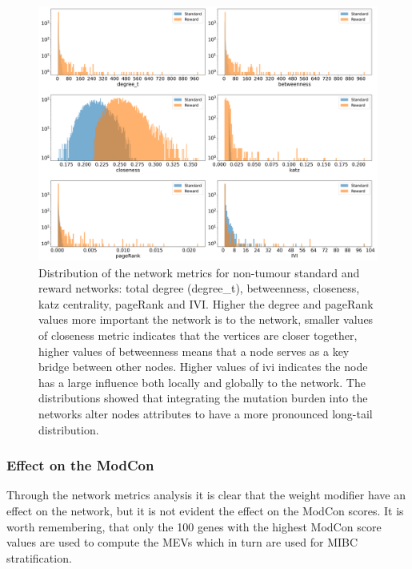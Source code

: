 \begin{figure}[!t]    
    \centering
    \includegraphics[width=1.0\textwidth,height=1.0\textheight,keepaspectratio]{Sections/Network_II/validation/net_metrics_Standard_Reward.png}
    \caption{Distribution of the network metrics for non-tumour standard and reward networks: total degree (degree\_t), betweenness, closeness, katz centrality, pageRank and IVI.  Higher the degree and pageRank values more important the network is to the network, smaller values of closeness metric indicates that the vertices are closer together, higher values of betweenness means that a node serves as a key bridge between other nodes. Higher values of \acrlong{ivi} indicates the node has a large influence both locally and globally to the network. The distributions showed that integrating the mutation burden into the networks alter nodes attributes to have a more pronounced long-tail distribution. }
    \label{fig:N_II:net_metric_sig_std}
\end{figure}


\subsubsection*{Effect on the ModCon}

Through the network metrics analysis it is clear that the weight modifier have an effect on the network, but it is not evident the effect on the ModCon scores. It is worth remembering, that only the 100 genes with the highest ModCon score values are used to compute the MEVs which in turn are used for MIBC stratification.


